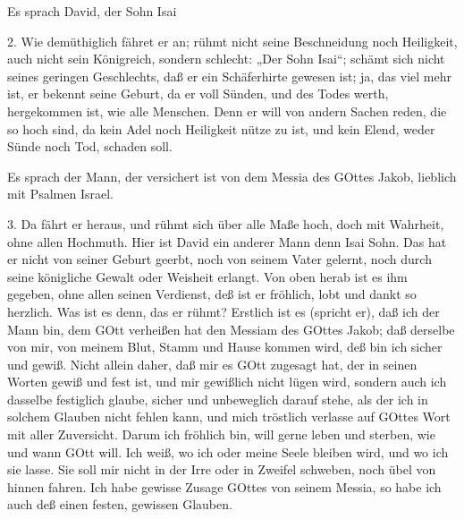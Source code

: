 \begin{schriftzitat}
Es sprach David, der Sohn Isai
\end{schriftzitat}

2. Wie demüthiglich fähret er an; rühmt nicht seine Beschneidung noch Heiligkeit, auch nicht sein Königreich, sondern schlecht: „Der Sohn Isai“; schämt sich nicht seines geringen Geschlechts, daß er ein Schäferhirte gewesen ist; ja, das viel mehr ist, er bekennt seine Geburt, da er voll Sünden, und des Todes werth, hergekommen
ist, wie alle Menschen. Denn er will von andern Sachen reden, die so hoch sind, da kein Adel noch Heiligkeit nütze zu ist, und kein Elend, weder Sünde noch Tod, schaden soll.

\begin{schriftzitat}
Es sprach der Mann, der versichert ist von dem Messia des GOttes Jakob, lieblich mit Psalmen Israel.
\end{schriftzitat}

3. Da fährt er heraus, und rühmt sich über alle Maße hoch, doch mit Wahrheit, ohne allen Hochmuth. Hier ist David ein anderer Mann denn Isai Sohn. Das hat er nicht von seiner Geburt geerbt, noch von seinem Vater gelernt, noch durch seine königliche Gewalt oder Weisheit erlangt. Von oben herab ist es ihm gegeben, ohne allen seinen Verdienst, deß ist er fröhlich, lobt und dankt so herzlich. Was ist es denn, das er rühmt? Erstlich ist es (spricht er), daß ich der Mann bin, dem GOtt verheißen hat den Messiam des GOttes Jakob; daß derselbe von mir, von meinem Blut, Stamm und Hause kommen wird, deß bin ich sicher und gewiß. Nicht allein daher, daß mir es GOtt zugesagt hat, der in seinen Worten gewiß und fest ist, und mir gewißlich nicht lügen wird, sondern auch ich dasselbe festiglich glaube, sicher und unbeweglich darauf stehe, als der ich in solchem Glauben nicht fehlen kann, und mich tröstlich verlasse auf GOttes Wort mit aller Zuversicht. Darum ich fröhlich bin, will gerne leben und sterben, wie und wann GOtt will. Ich weiß, wo ich oder meine Seele bleiben wird, und wo ich sie lasse. Sie soll mir nicht in der Irre oder in Zweifel schweben, noch übel von hinnen fahren. Ich habe gewisse Zusage GOttes von seinem Messia, so habe ich auch deß einen festen, gewissen Glauben.

